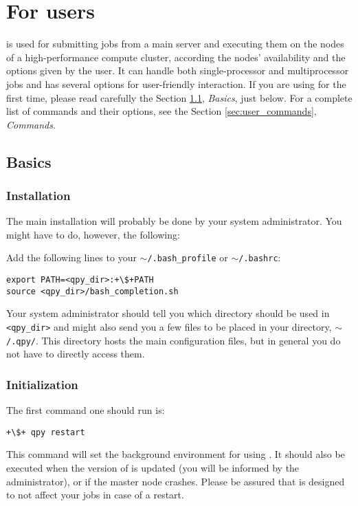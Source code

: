 \documentclass[a4paper,12pt]{article}
\begin{document}


\tableofcontents

\newpage
\section{For users}\label{sec:users}

\qpy{} is used for submitting jobs from a main server and executing them on the nodes of a high-performance compute cluster, according the nodes' availability and the options given by the user.
It can handle both single-processor and multiprocessor jobs and has several options for user-friendly  interaction.
If you are using \qpy{} for the first time, please read carefully the Section \ref{sec:user_basics}, \emph{Basics}, just below.
For a complete list of commands and their options, see the Section \ref{sec:user_commands}, \emph{Commands}.

\subsection{Basics}\label{sec:user_basics}

\subsubsection{Installation}

The main installation will probably be done by your system administrator.
You might have to do, however, the following:

Add the following lines to your $\sim$\texttt{/.bash\_profile} or $\sim$\texttt{/.bashrc}:
\begin{lstlisting}[style=FileStyle]
export PATH=<qpy_dir>:+\$+PATH
source <qpy_dir>/bash_completion.sh
\end{lstlisting}
Your system administrator should tell you which directory should be used in \texttt{<qpy\_dir>} and
 might also send you a few files to be placed in your \qpy{} directory, $\sim$\texttt{/.qpy/}.
This directory hosts the main configuration files, but in general you do not have to directly access them.

\subsubsection{Initialization}

The first \qpy{} command one should run is:
\begin{lstlisting}[style=BashStyle]
+\$+ qpy restart
\end{lstlisting}
This command will set the background environment for using \qpy{}.
It should also be executed when the version of \qpy{} is updated (you will be informed by the administrator), or if the master node crashes. Please be assured that \qpy{} is designed to not affect your jobs in case of a restart.
\end{document}
